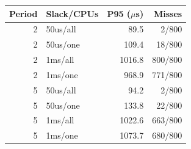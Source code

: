 \begin{tabular}{rlrr}
\toprule
Period & Slack/CPUs & P95 ($\mu$s) & Misses \\
\midrule
2 & 50us/all & 89.5 & 2/800 \\
2 & 50us/one & 109.4 & 18/800 \\
2 & 1ms/all & 1016.8 & 800/800 \\
2 & 1ms/one & 968.9 & 771/800 \\
5 & 50us/all & 94.2 & 2/800 \\
5 & 50us/one & 133.8 & 22/800 \\
5 & 1ms/all & 1022.6 & 663/800 \\
5 & 1ms/one & 1073.7 & 680/800 \\
\bottomrule
\end{tabular}
